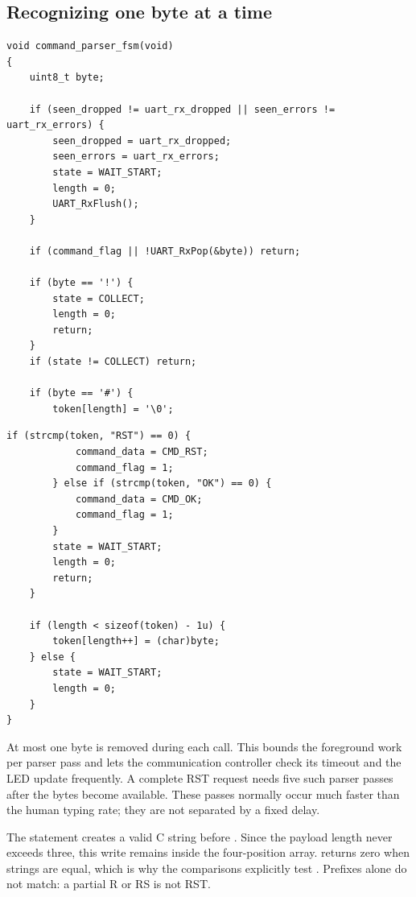 \documentclass[a4paper]{article}
\newcommand{\code}[1]{\texttt{\detokenize{#1}}}
\newcommand{\topic}[1]{\subsection{#1}}
\begin{document}
\topic{Recognizing one byte at a time}

\par\noindent\begin{minipage}{\linewidth}
\begin{lstlisting}[caption={Command parser and publication of a complete command},firstnumber=1]
void command_parser_fsm(void)
{
    uint8_t byte;

    if (seen_dropped != uart_rx_dropped || seen_errors != uart_rx_errors) {
        seen_dropped = uart_rx_dropped;
        seen_errors = uart_rx_errors;
        state = WAIT_START;
        length = 0;
        UART_RxFlush();
    }

    if (command_flag || !UART_RxPop(&byte)) return;

    if (byte == '!') {
        state = COLLECT;
        length = 0;
        return;
    }
    if (state != COLLECT) return;

    if (byte == '#') {
        token[length] = '\0';
\end{lstlisting}
\end{minipage}\par

\par\noindent\begin{minipage}{\linewidth}
\begin{lstlisting}[caption={Command parser and publication of a complete command (continued)},firstnumber=24]
        if (strcmp(token, "RST") == 0) {
            command_data = CMD_RST;
            command_flag = 1;
        } else if (strcmp(token, "OK") == 0) {
            command_data = CMD_OK;
            command_flag = 1;
        }
        state = WAIT_START;
        length = 0;
        return;
    }

    if (length < sizeof(token) - 1u) {
        token[length++] = (char)byte;
    } else {
        state = WAIT_START;
        length = 0;
    }
}
\end{lstlisting}
\end{minipage}\par

At most one byte is removed during each call. This bounds the foreground
work per parser pass and lets the communication controller check its timeout
and the LED update frequently. A complete RST request needs five such parser
passes after the bytes become available. These passes normally occur much
faster than the human typing rate; they are not separated by a fixed delay.

The statement \code{token[length] = '\0'} creates a valid C string before
\code{strcmp}. Since the payload length never exceeds three, this write remains
inside the four-position array. \code{strcmp} returns zero when strings are
equal, which is why the comparisons explicitly test \code{== 0}. Prefixes
alone do not match: a partial R or RS is not RST.
\end{document}

